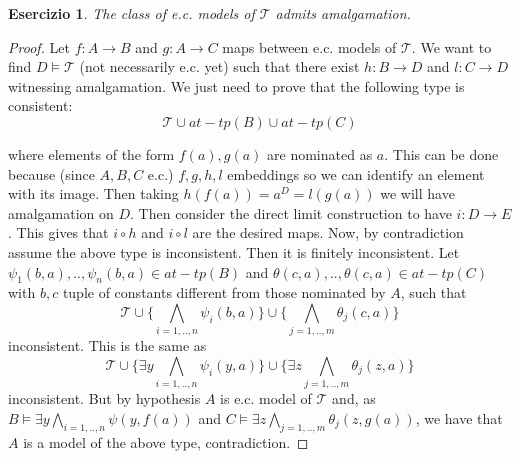 \documentclass{article}
\newtheorem{exercise}{Esercizio}
\begin{document}
\begin{exercise}

	The class of e.c. models of $\mathcal{T}$ admits amalgamation.

\end{exercise}

\begin{proof}

	Let $f:A \to B$ and $g: A \to C$ maps between e.c. models of $\mathcal{T}$.
	We want to find $D \models \mathcal{T}$ (not necessarily e.c. yet) such that there exist $h: B \to D$ and $l: C \to D$ witnessing amalgamation.
	We just need to prove that the following type is consistent: 
	\[
		\mathcal{T} \cup at-tp(B) \cup at-tp(C)
	\]

	where elements of the form $f(a),g(a)$ are nominated as $a$.
	This can be done because (since $A,B,C$ e.c.) $f,g,h,l$ embeddings so we can identify an element with its image.
	Then taking $h(f(a)) = a^D = l(g(a))$ we will have amalgamation on $D$.
	Then consider the direct limit construction to have $i: D \to E$.
	This gives that $i \circ h$ and $i \circ l$ are the desired maps.
	Now, by contradiction assume the above type is inconsistent.
	Then it is finitely inconsistent. Let $\psi_1(b,a),..,\psi_n(b,a) \in at-tp(B)$ and $\theta(c,a),..,\theta(c,a) \in at-tp(C)$ with $b,c$ tuple of constants
	different from those nominated by $A$,
	such that 
	\[
		\mathcal{T} \cup \{\bigwedge_{i=1,..,n} \psi_i(b,a)\} \cup \{\bigwedge_{j=1,..,m} \theta_j(c,a) \}
	\]
	inconsistent.
	This is the same as 
	\[
		\mathcal{T} \cup \{ \exists y \bigwedge_{i=1,..,n} \psi_i(y,a) \} \cup \{ \exists z \bigwedge_{j=1,..,m} \theta_j(z,a) \}
	\]
	inconsistent.
	But by hypothesis $A$ is e.c. model of $\mathcal{T}$ and, 
	as $B \models \exists y \bigwedge_{i=1,..,n} \psi(y,f(a))$ and $C \models \exists z \bigwedge_{j=1,..,m} \theta_j(z,g(a))$,
	we have that $A$ is a model of the above type, contradiction.

\end{proof}
\end{document}
